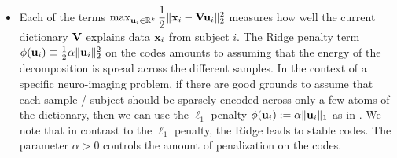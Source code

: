 \begin{itemize}
\item Each of the terms $\max_{\mathbf{u}_i \in \mathbb R^k}\dfrac{1}{2}\|\mathbf{x}_i-\mathbf{V}\mathbf{u}_i\|_2^2$ measures how well the current dictionary $\mathbf{V}$ explains data $\mathbf{x}_i$ from subject $i$.
The Ridge penalty term $\phi(\mathbf{u}_i) \equiv \frac{1}{2}\alpha\|\mathbf{u}_i\|_2^2$
on the codes amounts to assuming that the energy of the decomposition is
spread across the different samples. In the context of a specific
neuro-imaging problem, if there are good grounds to assume that each
sample / subject should be sparsely encoded across only a few atoms of
the dictionary, then we can use the $\ell_1$ penalty $\phi(\mathbf{u}_i) :=
\alpha\|\mathbf{u}_i\|_1$ as in  \cite{mairal2010}. We note that in contrast to
the $\ell_1$ penalty, the Ridge leads to stable codes. The parameter $\alpha > 0$ controls the amount of penalization on the codes. %



\end{itemize}
